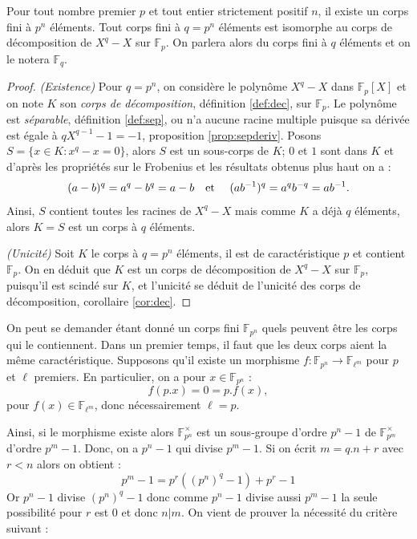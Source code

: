 \documentclass[a4paper]{article} %
\numberwithin{section}{part}
\numberwithin{equation}{section}
\newcommand\GF[1]{\mathbb{F}_{#1}}
\newcommand\etmath{\textup{\quad et \quad}}
\begin{document}
\begin{thm}
\label{th:isomGF}
Pour tout nombre premier $p$ et tout entier strictement positif $n$, il existe 
un corps fini à $p^n$ éléments. Tout corps fini à $q = p^n$ éléments est 
isomorphe au corps de décomposition de $X^q - X$ sur $\GF{p}$. On parlera 
alors du corps fini à $q$ éléments et on le notera $\GF{q}$.
\end{thm}
\begin{proof}
\textit{(Existence)} Pour $q = p^n$, on considère le polynôme $X^q - X$ dans 
$\GF{p}[X]$ et on note $K$ son \emph{corps de décomposition}, définition 
\ref{def:dec}, sur $\GF{p}$. Le polynôme est \emph{séparable}, définition 
\ref{def:sep}, ou n'a aucune racine multiple puisque sa dérivée est égale à 
$qX^{q-1} - 1 = -1$, proposition \ref{prop:sepderiv}. Posons $S=\lbrace x\in K 
: x^q - x = 0\rbrace$, alors $S$ est un sous-corps de $K$; $0$ et $1$ sont 
dans $K$ et d'après les propriétés sur le Frobenius et les résultats obtenus 
plus haut on a :
\begin{equation}
(a - b)^q = a^q - b^q = a - b \etmath(ab^{-1})^q = a^qb^{-q} = ab^{-1}.
\end{equation}
Ainsi, $S$ contient toutes les racines de $X^q - X$ mais comme $K$ a déjà $q$
éléments, alors $K = S$ est un corps à $q$ éléments.\par
\textit{(Unicité)} Soit $K$ le corps à $q = p^n$ éléments, il est de 
caractéristique $p$ et contient $\GF{p}$. On en déduit que $K$ est un corps de 
décomposition de $X^q - X$ sur $\GF{p}$, puisqu'il est scindé sur $K$, et 
l'unicité se déduit de l'unicité des corps de décomposition, corollaire 
\ref{cor:dec}.
\end{proof}

On peut se demander étant donné un corps fini $\GF{p^n}$ quels peuvent être les 
corps qui le contiennent. Dans un premier temps, il faut que les deux corps 
aient la même caractéristique. Supposons qu'il existe un morphisme $f : \GF{p^n}
\to \GF{\ell^m}$ pour $p$ et $\ell$ premiers. En particulier, on a pour 
$x\in\GF{p^n}$ :
\begin{equation}
f(p.x) = 0 = p.f(x),
\end{equation}
pour $f(x)\in\GF{\ell^m}$, donc nécessairement $\ell = p$.\par
Ainsi, si le morphisme existe alors $\GF{p^n}^{\times}$ est un sous-groupe
d'ordre $p^n - 1$ de $\GF{p^m}^{\times}$ d'ordre $p^m - 1$. Donc, on a $p^n - 1$
qui divise $p^m - 1$. Si on écrit $m = q.n + r$ avec $r < n$ alors on obtient :
\[p^m - 1 = p^r((p^n)^q - 1) + p^r - 1\]
Or $p^n - 1$ divise $(p^n)^q - 1$ donc comme $p^n - 1$ divise aussi $p^m - 1$ la
seule possibilité pour $r$ est $0$ et donc $n|m$. On vient de prouver la
nécessité du critère suivant :
\end{document}
